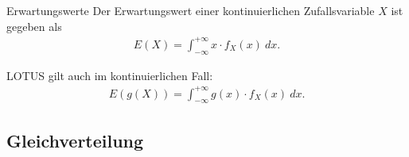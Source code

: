 \documentclass{beamer}
\def\padding{\vspace{0.5cm}}
\begin{document}
\begin{frame}
    \begin{block}{Erwartungswerte}
        Der Erwartungswert einer kontinuierlichen Zufallsvariable $X$ ist gegeben als
        \begin{align*}
            E(X) = \int_{- \infty}^{+ \infty} x \cdot f_X(x)\ dx.
        \end{align*}\pause\par\padding
        LOTUS gilt auch im kontinuierlichen Fall:
        \begin{align*}
            E(g(X)) = \int_{- \infty}^{+ \infty} g(x) \cdot f_X(x)\ dx.
        \end{align*}
    \end{block}
\end{frame}

\subsection{Gleichverteilung}
\end{document}
